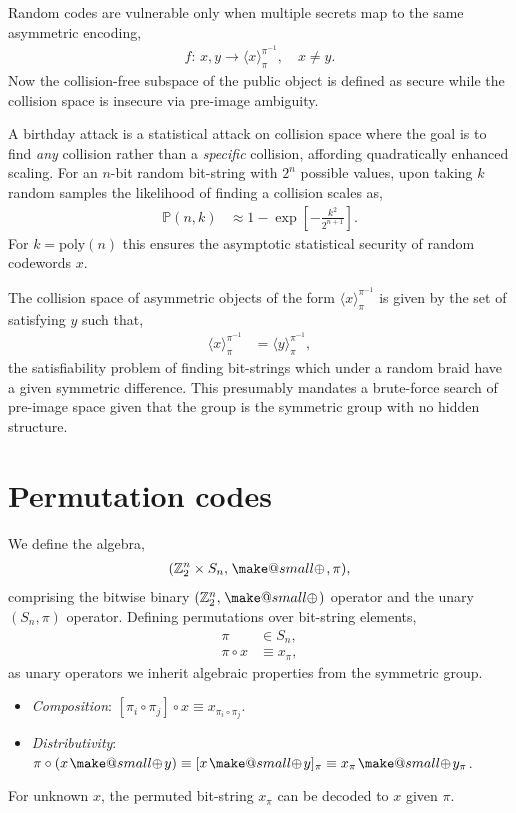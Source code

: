 \documentclass[twocolumn, aps, amsmath, amssymb, nofootinbib, superscriptaddress, longbibliography, doublefloatfix, table-of-contents, eqsecnum, rmp]{revtex4-2}
\makeatletter
\def\selfbraid#1#2#3{\langle#1\rangle_{#2}^{#3}}
\newcommand{\soplus}{{{\hspace{1pt}}{\mathbin{\mathpalette\make@small{\mathbin\oplus}}}}{\hspace{1pt}}}
\newcommand{\make@small}[2]{%
  \vcenter{\hbox{%
    \scalebox{0.6}{$\m@th#1#2$}%
  }}%
}
\makeatother
\begin{document}
Random codes are vulnerable only when multiple secrets map to the same asymmetric encoding,
\begin{align}
	f:\, x,y \to \selfbraid{x}{\pi}{\pi^{-1}},\quad x\neq y.
\end{align}
Now the collision-free subspace of the public object is defined as secure while the collision space is insecure via pre-image ambiguity.

A birthday attack is a statistical attack on collision space where the goal is to find \emph{any} collision rather than a \emph{specific} collision, affording quadratically enhanced scaling. For an $n$-bit random bit-string with $2^n$ possible values, upon taking $k$ random samples the likelihood of finding a collision scales as,
\begin{align}
	\mathbb{P}(n,k) &\approx 1 - \exp\left[-\frac{k^2}{2^{n+1}}\right].
\end{align}
For $k=\mathrm{poly}(n)$ this ensures the asymptotic statistical security of random codewords $x$.

The collision space of asymmetric objects of the form $\selfbraid{x}{\pi}{\pi^{-1}}$ is given by the set of satisfying $y$ such that,
\begin{align}
	\selfbraid{x}{\pi}{\pi^{-1}} &= \selfbraid{y}{\pi}{\pi^{-1}},
\end{align}
the satisfiability problem of finding bit-strings which under a random braid have a given symmetric difference. This presumably mandates a brute-force search of pre-image space given that the group is the symmetric group with no hidden structure.


\section{Permutation codes}

We define the algebra,
\begin{align}
	(\mathbb{Z}_2^n \times S_n, \soplus,\pi),
\end{align}
comprising the bitwise binary $(\mathbb{Z}_2^n,\soplus)$ operator and the unary $(S_n,\pi)$ operator. Defining permutations over bit-string elements,
\begin{align}
	\pi &\in S_n,\nonumber\\
	\pi\circ x &\equiv x_\pi,
\end{align}
as unary operators we inherit algebraic properties from the symmetric group.
\begin{itemize}
	\item \emph{Composition}: $[\pi_i \circ \pi_j]\circ x \equiv x_{\pi_i\circ \pi_j}$.
	\item \emph{Distributivity}: $\pi\circ(x\soplus y) \equiv [x\soplus y]_\pi \equiv x_\pi \soplus y_\pi$.
\end{itemize}
For unknown $x$, the permuted bit-string $x_\pi$ can be decoded to $x$ given $\pi$.
\end{document}
